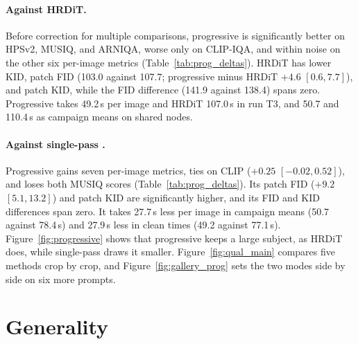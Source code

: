 \paragraph{Against HRDiT.} Before correction for multiple comparisons, progressive \sca{} is significantly better on HPSv2, MUSIQ, and ARNIQA, worse only on CLIP-IQA, and within noise on the other six per-image metrics (Table~\ref{tab:prog_deltas}). HRDiT has lower KID, patch FID (103.0 against 107.7; progressive minus HRDiT $+4.6$ $[0.6,7.7]$), and patch KID, while the FID difference (141.9 against 138.4) spans zero. Progressive \sca{} takes 49.2\,s per image and HRDiT 107.0\,s in run T3, and 50.7 and 110.4\,s as campaign means on shared nodes.

\paragraph{Against single-pass \sca{}.} Progressive \sca{} gains seven per-image metrics, ties on CLIP ($+0.25$ $[-0.02,0.52]$), and loses both MUSIQ scores (Table~\ref{tab:prog_deltas}). Its patch FID ($+9.2$ $[5.1,13.2]$) and patch KID are significantly higher, and its FID and KID differences span zero. It takes 27.7\,s less per image in campaign means (50.7 against 78.4\,s) and 27.9\,s less in clean times (49.2 against 77.1\,s). Figure~\ref{fig:progressive} shows that progressive \sca{} keeps a large subject, as HRDiT does, while single-pass \sca{} draws it smaller. Figure~\ref{fig:qual_main} compares five methods crop by crop, and Figure~\ref{fig:gallery_prog} sets the two modes side by side on six more prompts.


\apxbarrier
\section{Generality}
\label{app:generality}

